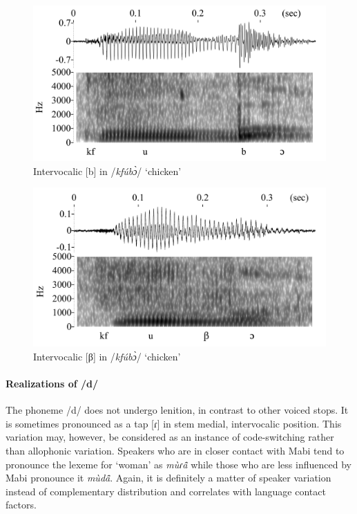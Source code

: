 
\begin{figure} 
\centering
\includegraphics[width=\textwidth]{figures/kfubo-mini}
\caption{Intervocalic [b] in /{\itshape kfúbɔ̀}/ `chicken'}
\label{Fig:kfubo}
\end{figure}



\begin{figure} 
\centering
\includegraphics[width=\textwidth]{figures/kfuwo-mini}
\caption{Intervocalic [β] in /{\itshape kfúbɔ̀}/ `chicken'}
\label{Fig:kfuwo}
\end{figure}

 

\paragraph{Realizations of /d/} The phoneme /d/ does not undergo lenition, in contrast to other voiced stops. It is sometimes pronounced as a tap [ɾ] in stem medial, intervocalic position. This variation may, however, be considered as an instance of code-switching rather than allophonic variation. Speakers who are in closer contact with Mabi tend to pronounce the lexeme for `woman' as {\itshape mùɾã̂} while those who are less influenced by Mabi pronounce it {\itshape mùdã̂}. Again, it is definitely a matter of speaker variation instead of complementary distribution and correlates with language contact factors.

